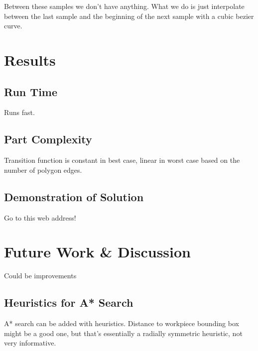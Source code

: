 Between these samples we don't have anything. What we do is just interpolate between the last sample and the beginning of the next sample with a cubic bezier curve.

\section{Results}

	\subsection{Run Time}

Runs fast.

	\subsection{Part Complexity}

Transition function is constant in best case, linear in worst case based on the number of polygon edges.

	\subsection{Demonstration of Solution}

Go to this web address!

\section{Future Work \& Discussion}

Could be improvements

	\subsection{Heuristics for A* Search}

A* search can be added with heuristics. Distance to workpiece bounding box might be a good one, but that's essentially a radially symmetric heuristic, not very informative.
